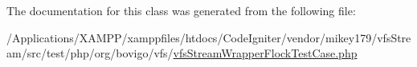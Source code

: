 The documentation for this class was generated from the following file\+:\begin{DoxyCompactItemize}
\item 
/\+Applications/\+X\+A\+M\+P\+P/xamppfiles/htdocs/\+Code\+Igniter/vendor/mikey179/vfs\+Stream/src/test/php/org/bovigo/vfs/\mbox{\hyperlink{vfs_stream_wrapper_flock_test_case_8php}{vfs\+Stream\+Wrapper\+Flock\+Test\+Case.\+php}}\end{DoxyCompactItemize}
